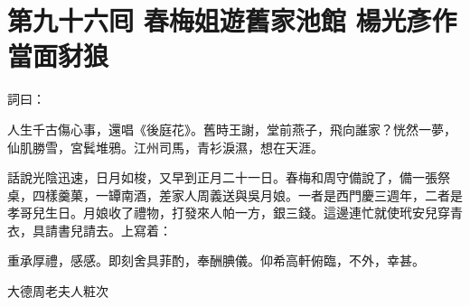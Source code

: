 
\chapter*{第九十六囘 春梅姐遊舊家池館 楊光彥作當面豺狼}


詞曰：

\begin{myquote}
人生千古傷心事，還唱《後庭花》。舊時王謝，堂前燕子，飛向誰家？恍然一夢，仙肌勝雪，宮鬂堆鴉。江州司馬，青衫淚濕，想在天涯。

\end{myquote}

話說光陰迅速，日月如梭，又早到正月二十一日。春梅和周守備說了，備一張祭桌，四樣羹菓，一罈南酒，差家人周義送與吳月娘。一者是西門慶三週年，二者是孝哥兒生日。月娘收了禮物，打發來人帕一方，銀三錢。這邊連忙就使玳安兒穿青衣，具請書兒請去。上寫着：

\begin{myquote}[\markfont]
重承厚禮，感感。即刻舍具菲酌，奉酬腆儀。仰希高軒俯臨，不外，幸甚。


大德周老夫人粧次
\end{myquote}

